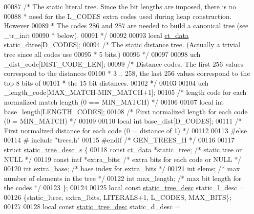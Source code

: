 \begin{DoxyCode}
00087 \textcolor{comment}{/* The static literal tree. Since the bit lengths are imposed, there is no}
00088 \textcolor{comment}{ * need for the L\_CODES extra codes used during heap construction. However}
00089 \textcolor{comment}{ * The codes 286 and 287 are needed to build a canonical tree (see \_tr\_init}
00090 \textcolor{comment}{ * below).}
00091 \textcolor{comment}{ */}
00092 
00093 local \hyperlink{structct__data__s}{ct\_data} static\_dtree[D\_CODES];
00094 \textcolor{comment}{/* The static distance tree. (Actually a trivial tree since all codes use}
00095 \textcolor{comment}{ * 5 bits.)}
00096 \textcolor{comment}{ */}
00097 
00098 uch \_dist\_code[DIST\_CODE\_LEN];
00099 \textcolor{comment}{/* Distance codes. The first 256 values correspond to the distances}
00100 \textcolor{comment}{ * 3 .. 258, the last 256 values correspond to the top 8 bits of}
00101 \textcolor{comment}{ * the 15 bit distances.}
00102 \textcolor{comment}{ */}
00103 
00104 uch \_length\_code[MAX\_MATCH-MIN\_MATCH+1];
00105 \textcolor{comment}{/* length code for each normalized match length (0 == MIN\_MATCH) */}
00106 
00107 local \textcolor{keywordtype}{int} base\_length[LENGTH\_CODES];
00108 \textcolor{comment}{/* First normalized length for each code (0 = MIN\_MATCH) */}
00109 
00110 local \textcolor{keywordtype}{int} base\_dist[D\_CODES];
00111 \textcolor{comment}{/* First normalized distance for each code (0 = distance of 1) */}
00112 
00113 \textcolor{preprocessor}{#else}
00114 \textcolor{preprocessor}{#  include "trees.h"}
00115 \textcolor{preprocessor}{#endif }\textcolor{comment}{/* GEN\_TREES\_H */}\textcolor{preprocessor}{}
00116 
00117 \textcolor{keyword}{struct }\hyperlink{structstatic__tree__desc__s}{static\_tree\_desc\_s} \{
00118     \textcolor{keyword}{const} \hyperlink{structct__data__s}{ct\_data} *static\_tree;  \textcolor{comment}{/* static tree or NULL */}
00119     \textcolor{keyword}{const} intf *extra\_bits;      \textcolor{comment}{/* extra bits for each code or NULL */}
00120     \textcolor{keywordtype}{int}     extra\_base;          \textcolor{comment}{/* base index for extra\_bits */}
00121     \textcolor{keywordtype}{int}     elems;               \textcolor{comment}{/* max number of elements in the tree */}
00122     \textcolor{keywordtype}{int}     max\_length;          \textcolor{comment}{/* max bit length for the codes */}
00123 \};
00124 
00125 local \textcolor{keyword}{const} \hyperlink{structstatic__tree__desc__s}{static\_tree\_desc}  static\_l\_desc =
00126 \{static\_ltree, extra\_lbits, LITERALS+1, L\_CODES, MAX\_BITS\};
00127 
00128 local \textcolor{keyword}{const} \hyperlink{structstatic__tree__desc__s}{static\_tree\_desc}  static\_d\_desc =

\end{DoxyCode}

